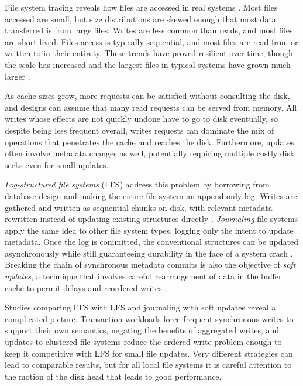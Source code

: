 File system tracing reveals how files are accessed in real systems \cite{ousterhout}. Most files accessed are small, but size distributions are skewed enough that most data transferred is from large files. Writes are less common than reads, and most files are short-lived. Files access is typically sequential, and most files are read from or written to in their entirety. These trends have proved resilient over time, though the scale has increased and the largest files in typical systems have grown much larger \cite{ruemmler,gibson98b,roselli}.

As cache sizes grow, more requests can be satisfied without consulting the disk, and designs can assume that many read requests can be served from memory. All writes whose effects are not quickly undone have to go to disk eventually, so despite being less frequent overall, writes requests can dominate the mix of operations that penetrates the cache and reaches the disk. Furthermore, updates often involve metadata changes as well, potentially requiring multiple costly disk seeks even for small updates.

\emph{Log-structured file systems} (LFS) address this problem by borrowing from database design and making the entire file system an append-only log. Writes are gathered and written as sequential chunks on disk, with relevant metadata rewritten instead of updating existing structures directly \cite{rosenblum}. \emph{Journaling} file systems apply the same idea to other file system types, logging only the intent to update metadata. Once the log is committed, the conventional structures can be updated asynchronously while still guaranteeing durability in the face of a system crash \cite{hagmann,sweeney,tweedie}. Breaking the chain of synchronous metadata commits is also the objective of \emph{soft updates}, a technique that involves careful rearrangement of data in the buffer cache to permit delays and reordered writes \cite{ganger94}.

Studies comparing FFS with LFS \cite{seltzer95} and journaling with soft updates \cite{seltzer00} reveal a complicated picture. Transaction workloads force frequent synchronous writes to support their own semantics, negating the benefits of aggregated writes, and updates to clustered file systems reduce the ordered-write problem enough to keep it competitive with LFS for small file updates. Very different strategies can lead to comparable results, but for all local file systems it is careful attention to the motion of the disk head that leads to good performance.

